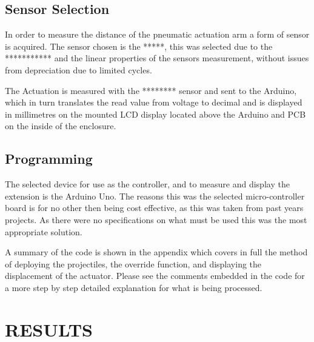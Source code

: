 \documentclass[a4paper, 10pt]{IEEEconf}
\begin{document}

\subsection{Sensor Selection}

In order to measure the distance of the pneumatic actuation arm a form of sensor is acquired. The sensor chosen is the *****, this was selected due to the *********** and the linear properties of the sensors measurement, without issues from depreciation due to limited cycles.

The Actuation is measured with the ******** sensor and sent to the Arduino, which in turn translates the read value from voltage to decimal and is displayed in millimetres on the mounted LCD display located above the Arduino and PCB on the inside of the enclosure. 



\subsection{Programming}

The selected device for use as the controller, and to measure and display the extension is the Arduino Uno. The reasons this was the selected micro-controller board is for no other then being cost effective, as this was taken from past years projects. As there were no specifications on what must be used this was the most appropriate solution.

A summary of the code is shown in the appendix which covers in full the method of deploying the projectiles, the override function, and displaying the displacement of the actuator. Please see the comments embedded in the code for a more step by step detailed explanation for what is being processed.


\section{RESULTS}
\end{document}
